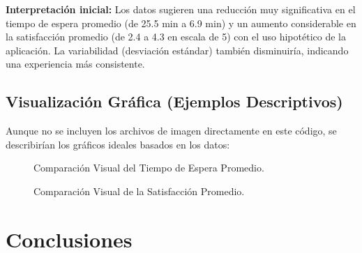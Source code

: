 \documentclass[11pt, a4paper]{article}
\begin{document}
\textbf{Interpretación inicial:} Los datos sugieren una reducción muy significativa en el tiempo de espera promedio (de 25.5 min a 6.9 min) y un aumento considerable en la satisfacción promedio (de 2.4 a 4.3 en escala de 5) con el uso hipotético de la aplicación. La variabilidad (desviación estándar) también disminuiría, indicando una experiencia más consistente.

\subsection{Visualización Gráfica (Ejemplos Descriptivos)}

Aunque no se incluyen los archivos de imagen directamente en este código, se describirían los gráficos ideales basados en los datos:

\begin{figure}[H] %
    \centering
    \caption{Comparación Visual del Tiempo de Espera Promedio.}
    \label{fig:graf_tiempo}
\end{figure}

\begin{figure}[H] %
    \centering
    \caption{Comparación Visual de la Satisfacción Promedio.}
    \label{fig:graf_satisfaccion}
\end{figure}

\section{Conclusiones}
\label{sec:conclusiones}
\end{document}
